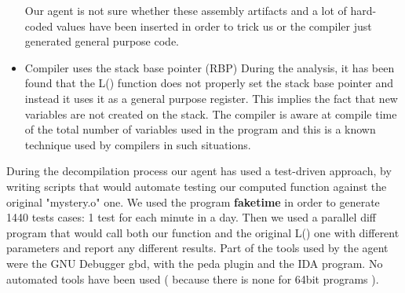 \begin{itemize}
 Our agent is not sure whether these assembly artifacts and a lot of hard-coded values have been inserted in order to trick us or the compiler just generated general purpose code. 
 \item Compiler uses the stack base pointer (RBP)
 During the analysis, it has been found that the L() function does not properly set the stack base pointer and instead it uses it as a general purpose register. This implies the fact that new variables are not created on the stack. The compiler is aware at compile time of the total number of variables used in the program and this is a known technique used by compilers in such situations. 
  
\end{itemize}

During the decompilation process our agent has used a test-driven approach, by writing scripts that would automate testing our computed function against the original "mystery.o" one. We used the program \textbf{faketime} in order to generate 1440 tests cases: 1 test for each minute in a day. Then we used a parallel diff program that would call both our function and the original L() one with different parameters and report any different results. Part of the tools used by the agent were the GNU Debugger gbd, with the peda plugin and the IDA program. No automated tools have been used ( because there is none for 64bit programs ).
